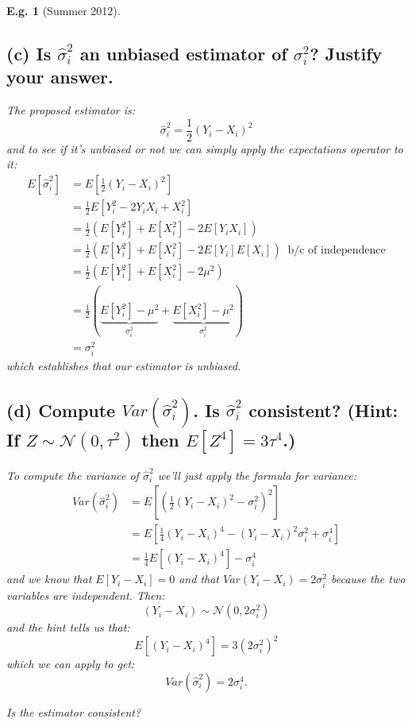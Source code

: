 \documentclass{tufte-book}
\theoremstyle{mytheoremstyle}
\theoremstyle{mylemstyle}
\theoremstyle{mydefstyle}
\newtheorem*{ex}{E.g.}
\begin{document}
\begin{ex}[Summer 2012]
\subsection{(c) Is \(\hat{\sigma}_i^2\) an unbiased estimator of \(\sigma_i^2\)? Justify your answer.}
The proposed estimator is:
	\[\hat{\sigma}_i^2 = \frac{1}{2} (Y_i - X_i)^2\]
and to see if it's unbiased or not we can simply apply the expectations operator to it:
	\begin{align*}
		E[\hat{\sigma}_i^2] &= E\left[\frac{1}{2} (Y_i - X_i)^2 \right] \\
						&= \frac{1}{2} E[Y_i^2 - 2Y_i X_i + X_i^2] \\
						&= \frac{1}{2} \left( E[Y_i^2] + E[X_i^2] - 2E[Y_i X_i] \right) \\
						&= \frac{1}{2} \left( E[Y_i^2] + E[X_i^2] - 2E[Y_i] E[X_i] \right)\ \text{ b/c of independence} \\
						&= \frac{1}{2} \left( E[Y_i^2] + E[X_i^2] - 2\mu^2 \right) \\
						&= \frac{1}{2}\left( \underbrace{E[Y_i^2] - \mu^2}_\textrm{\(\sigma_i^2\)} + \underbrace{E[X_i^2] - \mu^2}_\textrm{\(\sigma_i^2\)} \right) \\
						&= \sigma_i^2
	\end{align*}
which establishes that our estimator is unbiased.

\subsection{(d) Compute \(Var(\hat{\sigma}_i^2)\). Is \(\hat{\sigma}_i^2\) consistent? (Hint: If \(Z \sim \mathcal{N}(0, \tau^2)\) then \(E[Z^4] = 3\tau^4\).)} 
To compute the variance of \(\hat{\sigma}_i^2\) we'll just apply the formula for variance:
	\begin{align*}
		Var(\hat{\sigma}_i^2) &= E\left[ \left(\frac{1}{2}(Y_i - X_i)^2 - \sigma_i^2 \right)^2 \right] \\
						&= E\left[\frac{1}{4}(Y_i - X_i)^4 - (Y_i-X_i)^2 \sigma_i^2 + \sigma_i^4 \right] \\
						&= \frac{1}{4} E[(Y_i - X_i)^4] - \sigma_i^4
	\end{align*}
and we know that \(E[Y_i - X_i] = 0\) and that \(Var(Y_i - X_i) = 2 \sigma_i^2\) because the two variables are independent. Then:
	\[(Y_i - X_i) \sim \mathcal{N}(0, 2\sigma_i^2)\]
and the hint tells us that:
	\[E[(Y_i - X_i)^4] = 3(2\sigma_i^2)^2 \]
which we can apply to get:
	\[Var(\hat{\sigma}_i^2) = 2\sigma_i^4 \text{.}\]
	
Is the estimator consistent? 
\end{ex}
\end{document}
